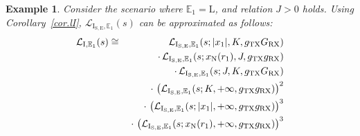 \documentclass[10pt,journal,a4paper]{IEEEtran}
\newtheorem{example}{Example}[section]
\begin{document}
\begin{example}
Consider the scenario where $\mathbb{E}_1 = \mathrm{L}$, and relation $J > 0$ holds. Using Corollary~\ref{cor.lI}, $\mathcal{L}_{\mathrm{I}_{\mathrm{S,E}},\mathbb{E}_1}(s)$ can be approximated as follows:
\setlength{\arraycolsep}{0.0em} 
\begin{eqnarray}
\mathcal{L}_{\mathrm{I},\mathbb{E}_1}(s) &{}\cong{}& {\mathcal{L}_{\mathrm{I}_{\mathrm{S,E}},\mathbb{E}_1}(s;|x_1|,K,g_\mathrm{TX}G_\mathrm{RX})}\notag\\
&& \cdot \, {\mathcal{L}_{\mathrm{I}_{\mathrm{S,E}},\mathbb{E}_1}(s;x_\mathrm{N}(r_1),J,g_\mathrm{TX}g_\mathrm{RX})}\nonumber\\
&& \cdot \, {\mathcal{L}_{\mathrm{I}_{\mathrm{S,E}},\mathbb{E}_1}(s;J,K,g_\mathrm{TX}G_\mathrm{RX})}\nonumber\\
&& \cdot \, \left({\mathcal{L}_{\mathrm{I}_{\mathrm{S,E}},\mathbb{E}_1}(s;K,+\infty,g_\mathrm{TX}g_\mathrm{RX})}\right)^2\nonumber\\
&& \cdot \, \left({\mathcal{L}_{\mathrm{I}_{\mathrm{S,E}},\mathbb{E}_1}(s;|x_1|,+\infty,g_\mathrm{TX}g_\mathrm{RX})}\right)^3\nonumber\\
&& \cdot \, \left({\mathcal{L}_{\mathrm{I}_{\mathrm{S,E}},\mathbb{E}_1}(s;x_\mathrm{N}(r_1),+\infty,g_\mathrm{TX}g_\mathrm{RX})}\right)^3
\end{eqnarray}
\end{example}
\end{document}

